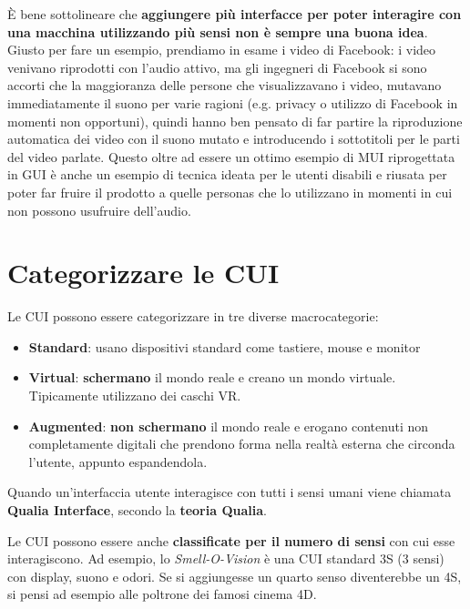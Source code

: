\documentclass[a4paper,11pt,oneside]{book}
\begin{document}
È bene sottolineare che \textbf{aggiungere più interfacce per poter interagire con una macchina utilizzando più sensi non è sempre una buona idea}. Giusto per fare un esempio, prendiamo in esame i video di Facebook: i video venivano riprodotti con l'audio attivo, ma gli ingegneri di Facebook si sono accorti che la maggioranza delle persone che visualizzavano i video, mutavano immediatamente il suono per varie ragioni (e.g. privacy o utilizzo di Facebook in momenti non opportuni), quindi hanno ben pensato di far partire la riproduzione automatica dei video con il suono mutato e introducendo i sottotitoli per le parti del video parlate. Questo oltre ad essere un ottimo esempio di MUI riprogettata in GUI è anche un esempio di tecnica ideata per le utenti disabili e riusata per poter far fruire il prodotto a quelle personas che lo utilizzano in momenti in cui non possono usufruire dell'audio.

\section{Categorizzare le CUI}
Le CUI possono essere categorizzare in tre diverse macrocategorie:

\begin{itemize}
	\item \textbf{Standard}: usano dispositivi standard come tastiere, mouse e monitor
	\item \textbf{Virtual}: \textbf{schermano} il mondo reale e creano un mondo virtuale. Tipicamente utilizzano dei caschi VR.
	\item \textbf{Augmented}: \textbf{non schermano} il mondo reale e erogano contenuti non completamente digitali che prendono forma nella realtà esterna che circonda l'utente, appunto espandendola.
\end{itemize}

Quando un'interfaccia utente interagisce con tutti i sensi umani viene chiamata \textbf{Qualia Interface}, secondo la \textbf{teoria Qualia}.

Le CUI possono essere anche \textbf{classificate per il numero di sensi} con cui esse interagiscono. Ad esempio, lo \textit{Smell-O-Vision} è una CUI standard 3S (3 sensi) con display, suono e odori. Se si aggiungesse un quarto senso diventerebbe un 4S, si pensi ad esempio alle poltrone dei famosi cinema 4D.
\end{document}
